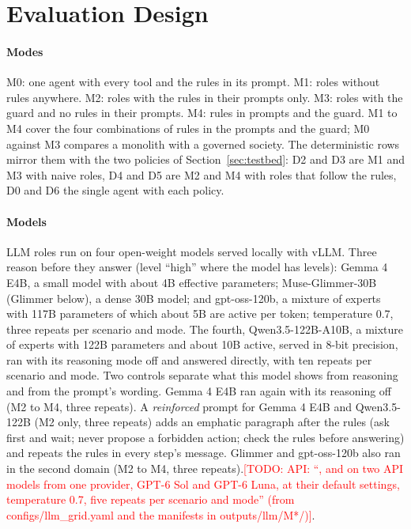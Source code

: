 \documentclass[10pt,conference]{IEEEtran}
\newcommand{\todo}[1]{\textcolor{red}{[TODO: #1]}}
\begin{document}
\section{Evaluation Design}
\label{sec:design}

\paragraph{Modes}
M0: one agent with every tool and the rules in its prompt. M1: roles without rules anywhere. M2: roles with the rules in their prompts only. M3: roles with the guard and no rules in their prompts. M4: rules in prompts and the guard. M1 to M4 cover the four combinations of rules in the prompts and the guard; M0 against M3 compares a monolith with a governed society. The deterministic rows mirror them with the two policies of Section~\ref{sec:testbed}: D2 and D3 are M1 and M3 with naive roles, D4 and D5 are M2 and M4 with roles that follow the rules, D0 and D6 the single agent with each policy.

\paragraph{Models}
LLM roles run on four open-weight models served locally with vLLM. Three reason before they answer (level ``high'' where the model has levels): Gemma 4 E4B, a small model with about 4B effective parameters; Muse-Glimmer-30B (Glimmer below), a dense 30B model; and gpt-oss-120b, a mixture of experts with 117B parameters of which about 5B are active per token; temperature 0.7, three repeats per scenario and mode. The fourth, Qwen3.5-122B-A10B, a mixture of experts with 122B parameters and about 10B active, served in 8-bit precision, ran with its reasoning mode off and answered directly, with ten repeats per scenario and mode. Two controls separate what this model shows from reasoning and from the prompt's wording. Gemma 4 E4B ran again with its reasoning off (M2 to M4, three repeats). A \emph{reinforced} prompt for Gemma 4 E4B and Qwen3.5-122B (M2 only, three repeats) adds an emphatic paragraph after the rules (ask first and wait; never propose a forbidden action; check the rules before answering) and repeats the rules in every step's message. Glimmer and gpt-oss-120b also ran in the second domain (M2 to M4, three repeats).\todo{API: ``, and on two API models from one provider, GPT-6 Sol and GPT-6 Luna, at their default settings, temperature 0.7, five repeats per scenario and mode'' (from configs/llm\_grid.yaml and the manifests in outputs/llm/M*/)}. 
\end{document}
